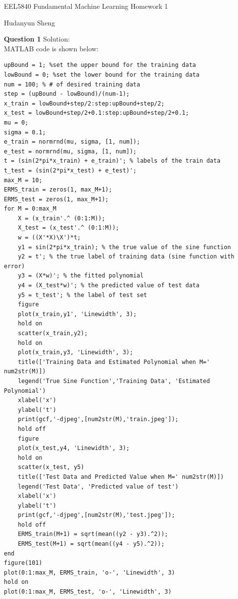 \documentclass[a4paper]{article}
\begin{document}
\begin{spacing}{2.0}
\begin{flushleft}\begin{huge}EEL5840 Fundamental Machine Learning   Homework 1\end{huge}\end{flushleft}
\begin{flushright}\begin{Large} Hudanyun Sheng \end{Large}\end{flushright}

\huge\textbf{ Question 1}      \Large{Solution:} \\
	\normalsize 
	MATLAB code is shown below: 
	\begin{lstlisting}
upBound = 1; %set the upper bound for the training data
lowBound = 0; %set the lower bound for the training data
num = 100; % # of desired training data
step = (upBound - lowBound)/(num-1);
x_train = lowBound+step/2:step:upBound+step/2;
x_test = lowBound+step/2+0.1:step:upBound+step/2+0.1;
mu = 0;
sigma = 0.1;
e_train = normrnd(mu, sigma, [1, num]);
e_test = normrnd(mu, sigma, [1, num]);
t = (sin(2*pi*x_train) + e_train)'; % labels of the train data
t_test = (sin(2*pi*x_test) + e_test)';
max_M = 10;
ERMS_train = zeros(1, max_M+1);
ERMS_test = zeros(1, max_M+1);
for M = 0:max_M
    X = (x_train'.^ (0:1:M));
    X_test = (x_test'.^ (0:1:M));
    w = ((X'*X)\X')*t;
    y1 = sin(2*pi*x_train); % the true value of the sine function
    y2 = t'; % the true label of training data (sine function with error)
    y3 = (X*w)'; % the fitted polynomial
    y4 = (X_test*w)'; % the predicted value of test data
    y5 = t_test'; % the label of test set
    figure
    plot(x_train,y1', 'Linewidth', 3);
    hold on
    scatter(x_train,y2);
    hold on
    plot(x_train,y3, 'Linewidth', 3);
    title(['Training Data and Estimated Polynomial when M=' num2str(M)])
    legend('True Sine Function','Training Data', 'Estimated Polynomial')
    xlabel('x')
    ylabel('t')
    print(gcf,'-djpeg',[num2str(M),'train.jpeg']);
    hold off    
    figure
    plot(x_test,y4, 'Linewidth', 3);
    hold on
    scatter(x_test, y5)
    title(['Test Data and Predicted Value when M=' num2str(M)])
    legend('Test Data', 'Predicted value of test')
    xlabel('x')
    ylabel('t')
    print(gcf,'-djpeg',[num2str(M),'test.jpeg']);
    hold off
    ERMS_train(M+1) = sqrt(mean((y2 - y3).^2));
    ERMS_test(M+1) = sqrt(mean((y4 - y5).^2));
end
figure(101)
plot(0:1:max_M, ERMS_train, 'o-', 'Linewidth', 3)
hold on
plot(0:1:max_M, ERMS_test, 'o-', 'Linewidth', 3)

\end{lstlisting}
\end{spacing}
\end{document}
